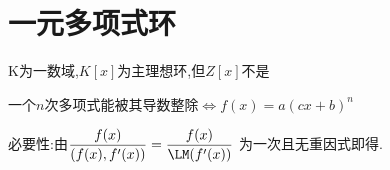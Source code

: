 \section{一元多项式环}
K为一数域,$ K[x]$为主理想环,但$ Z[x]$不是

一个$ n$次多项式能被其导数整除$ \Leftrightarrow f(x)=a(cx+b)^n$

必要性:由$ \dfrac{f(x)}{(f(x),f'(x))}=\dfrac{f(x)}{\LM(f'(x))}$
为一次且无重因式即得.
